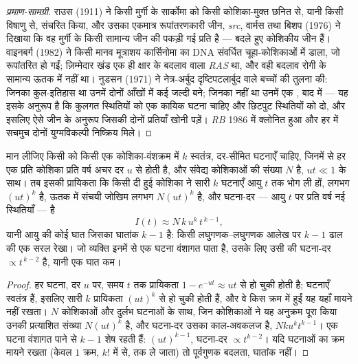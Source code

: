 \begin{proof}[प्रमाण-सामग्री]
राउस (1911) ने किसी मुर्गी के सार्कोमा को किसी कोशिका-मुक्त छनित से,
यानी किसी विषाणु से, संचरित किया, और उसका एकमात्र रूपांतरणकारी जीन,
\emph{src}, वार्मस तथा बिशप (1976) ने दिखाया कि वह मुर्गी के किसी
सामान्य जीन की पकड़ी गई प्रति है ---  बदले हुए कोशिकीय जीन हैं।
वाइनबर्ग (1982) ने किसी मानव मूत्राशय कार्सिनोमा का DNA संवर्धित चूहा-कोशिकाओं
में डाला, जो रूपांतरित हो गईं; ज़िम्मेदार खंड एक ही क्षार के बदलाव वाला
\emph{RAS} था, और वही बदलाव रोगी के सामान्य ऊतक में नहीं था।
नुडसन (1971) ने नेत्र-अर्बुद दृष्टिपटलार्बुद वाले बच्चों की तुलना की:
जिनका कुल-इतिहास था उनमें दोनों आँखों में कई  जल्दी बने; जिनका
नहीं था उनमें एक , बाद में --- यह इसके अनुरूप है कि कुलगत
स्थितियों को एक कायिक घटना चाहिए और छिटपुट स्थितियों को दो, और इसलिए
ऐसे जीन के अनुरूप जिसकी दोनों प्रतियाँ खोनी पड़ें। \emph{RB}
1986 में क्लोनित हुआ और हर  में सचमुच दोनों युग्मविकल्पी निष्क्रिय
मिले।
\end{proof}

\begin{theorem}[आघात और आयु-वक्र]\label{thm:b3:cancer-biology:armitage-doll}
मान लीजिए किसी  को किसी एक कोशिका-वंशक्रम में $k$ स्वतंत्र,
दर-सीमित घटनाएँ चाहिए, जिनमें से हर एक प्रति कोशिका प्रति वर्ष अचर दर
$u$ से होती है, और संवेद्य कोशिकाओं की संख्या $N$ है, $ut \ll 1$ के
साथ। तब इसकी प्रायिकता कि किसी दी हुई कोशिका ने सारी $k$ घटनाएँ
आयु $t$ तक भोग ली हों, लगभग $(ut)^{k}$ है, ऊतक में संचयी जोखिम लगभग
$N(ut)^{k}$ है, और घटना-दर --- आयु $t$ पर प्रति वर्ष नई स्थितियाँ --- है
\[
I(t) \approx N\,k\,u^{k}\,t^{\,k-1},
\]
यानी आयु की कोई घात जिसका घातांक $k - 1$ है: किसी लघुगणक--लघुगणक आलेख पर
$k - 1$ ढाल की एक सरल रेखा। जो व्यक्ति इनमें से एक घटना वंशागत पाता है,
उसके लिए उसी  की घटना-दर $\propto t^{\,k-2}$ है, यानी एक घात कम।
\end{theorem}
\begin{proof}
हर घटना, दर $u$ पर, समय $t$ तक प्रायिकता
$1 - e^{-ut} \approx ut$ से हो चुकी होती है; घटनाएँ स्वतंत्र हैं, इसलिए
सारी $k$ प्रायिकता $(ut)^{k}$ से हो चुकी होती हैं, और वे किस क्रम में
हुईं यह यहाँ मायने नहीं रखता। $N$ कोशिकाओं और दुर्लभ घटनाओं के साथ,
जिन कोशिकाओं ने यह अनुक्रम पूरा किया उनकी प्रत्याशित संख्या
$N(ut)^{k}$ है, और घटना-दर उसका काल-अवकलज है, $Nku^{k}t^{k-1}$।
एक घटना वंशागत पाने से $k - 1$ शेष रहती हैं: $(ut)^{k-1}$, घटना-दर
$\propto t^{k-2}$। यदि घटनाओं का क्रम मायने रखता (केवल $1$ क्रम,
$k!$ में से,  तक ले जाता) तो पूर्वगुणक बदलता, घातांक नहीं।
\end{proof}

